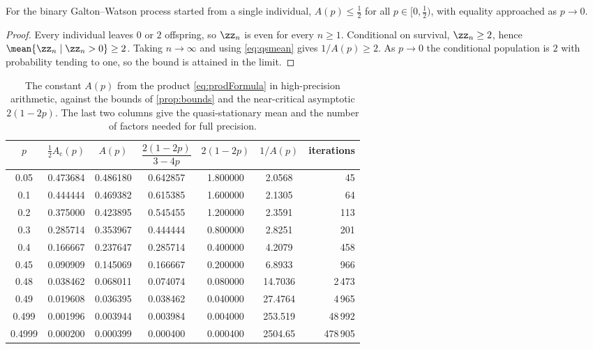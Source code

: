 \begin{proposition}
\label{prop:parity}
For the binary Galton--Watson process started from a single individual, \(A(p)\le\tfrac12\) for all \(p\in[0,\tfrac12)\), with equality approached as \(p\to0\).
\end{proposition}

\begin{proof}
Every individual leaves \(0\) or \(2\) offspring, so \(\zz_n\) is even for every \(n\ge1\). Conditional on survival, \(\zz_n\ge2\), hence \(\mean{\zz_n\mid \zz_n>0}\ge2\). Taking \(n\to\infty\) and using \cref{eq:qsmean} gives \(1/A(p)\ge2\). As \(p\to0\) the conditional population is \(2\) with probability tending to one, so the bound is attained in the limit.
\end{proof}

\begin{table}[ht]
\centering
\caption{The constant \(A(p)\) from the product \cref{eq:prodFormula} in high-precision arithmetic, against the bounds of \cref{prop:bounds} and the near-critical asymptotic \(2(1-2p)\). The last two columns give the quasi-stationary mean and the number of factors needed for full precision.}
\label{tab:Avals}
\begin{tabular}{ccccccr}
\toprule
$p$ & $\tfrac12 A_{\text{c}}(p)$ & $A(p)$ & $\dfrac{2(1-2p)}{3-4p}$ & $2(1-2p)$ & $1/A(p)$ & iterations\\
\midrule
0.05   & 0.473684 & 0.486180 & 0.642857 & 1.800000 & 2.0568 & 45 \\
0.1    & 0.444444 & 0.469382 & 0.615385 & 1.600000 & 2.1305 & 64 \\
0.2    & 0.375000 & 0.423895 & 0.545455 & 1.200000 & 2.3591 & 113 \\
0.3    & 0.285714 & 0.353967 & 0.444444 & 0.800000 & 2.8251 & 201 \\
0.4    & 0.166667 & 0.237647 & 0.285714 & 0.400000 & 4.2079 & 458 \\
0.45   & 0.090909 & 0.145069 & 0.166667 & 0.200000 & 6.8933 & 966 \\
0.48   & 0.038462 & 0.068011 & 0.074074 & 0.080000 & 14.7036 & 2\,473 \\
0.49   & 0.019608 & 0.036395 & 0.038462 & 0.040000 & 27.4764 & 4\,965 \\
0.499  & 0.001996 & 0.003944 & 0.003984 & 0.004000 & 253.519 & 48\,992 \\
0.4999 & 0.000200 & 0.000399 & 0.000400 & 0.000400 & 2504.65 & 478\,905 \\
\bottomrule
\end{tabular}
\end{table}

